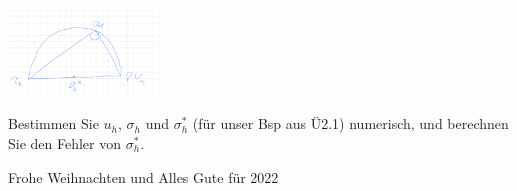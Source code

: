 \documentclass[11pt,a4paper]{report}
\begin{document}
\begin{enumerate}
    \begin{center}
\includegraphics[width=0.3\textwidth]{Thales.png}
\end{center}
      
Bestimmen Sie $u_h$, $\sigma_h$ und $\sigma_h^\ast$ (f\"ur unser Bsp
aus \"U2.1) numerisch, und
berechnen Sie den Fehler von $\sigma_h^\ast$.
      
\end{enumerate}

\bigskip

\centerline{Frohe Weihnachten und Alles Gute f\"ur 2022}
\end{document}
